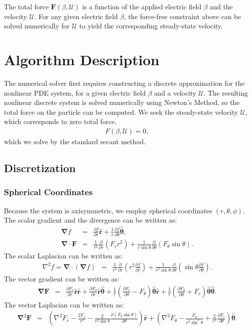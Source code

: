 \documentclass[10pt]{ijnam}
\newcommand{\deriv}[2]{\frac{\partial #1}{\partial #2}}
\newcommand{\pars}[1]{\left(#1\right)}
\newcommand\Laplacian{\nabla^2}
\newcommand\bnabla{\boldsymbol{\nabla}}
\newcommand\bLaplacian{\boldsymbol{\nabla}^2}
\newcommand\bF{\boldsymbol{F}}
\newcommand\br{\boldsymbol{r}}
\newcommand\brhat{\hat{\br}}
\newcommand\btheta{\boldsymbol{\theta}}
\newcommand\bthetahat{\hat{\btheta}}
\newcommand\cU{\mathscr{U}}
\begin{document}
The total force $\bF(\beta, \cU)$ is a function of the applied electric field $\beta$ and
the velocity $\cU$.
For any given electric field $\beta$, the force-free constraint above 
can be solved numerically for $\cU$ to yield the corresponding steady-state velocity.

\section{Algorithm Description} \label{sec:algorithm}
The numerical solver first requires constructing a discrete 
approximation for the nonlinear PDE system,
for a given electric field $\beta$ and a velocity $\cU$. 
The resulting nonlinear discrete system is
solved numerically using Newton's Method, so the total force on the
particle can be computed. 
We seek the steady-state velocity $\cU$, 
which corresponds to zero total force,
\begin{eqnarray*} 
F(\beta, \cU) = 0,
\end{eqnarray*}
which we solve by the standard secant method.

\subsection{Discretization}
\subsubsection{Spherical Coordinates}
Because the system is axisymmetric, we employ
spherical coordinates $(r,\theta,\phi)$.
The scalar gradient and the divergence can be written as:
\begin{eqnarray*}
\bnabla f &=& \deriv{f}{r}\brhat + \frac{1}{r}\deriv{f}{\theta}\bthetahat, \\
\bnabla \cdot \bF &=& \frac{1}{r^2}\deriv{}{r}\pars{F_r r^2 } + 
               \frac{1}{r \sin\theta}\deriv{}{\theta}\pars{F_\theta \sin\theta}.
\end{eqnarray*}
The scalar Laplacian can be written as:
\begin{eqnarray*}
\Laplacian f = \bnabla \cdot (\bnabla f)&=& 
 \frac{1}{r^2}\deriv{}{r}\pars{r^2 \deriv{f}{r}} + 
 \frac{1}{r^2 \sin\theta}\deriv{}{\theta}\pars{\sin\theta \deriv{f}{\theta}}.
\end{eqnarray*}
The vector gradient can be written as:
\begin{eqnarray*}
\bnabla \bF &=& \deriv{F_r}{r} \brhat \brhat + \deriv{F_\theta}{r} \brhat \bthetahat + 
\frac{1}{r}\pars{\deriv{F_r}{\theta} - F_\theta} \bthetahat \brhat + 
\frac{1}{r}\pars{\deriv{F_\theta}{\theta} + F_r} \bthetahat \bthetahat.
\end{eqnarray*}
The vector Laplacian can be written as:
\begin{eqnarray*}
\bLaplacian \bF &=& 
\left(\Laplacian F_r - \frac{2F_r}{r^2} - 
\frac{2}{r^2 \sin\theta} \deriv{\left(F_\theta \sin\theta \right)}{\theta}\right)\brhat
+ \left(\Laplacian F_\theta - \frac{F_\theta}{r^2 \sin^2\theta} + 
\frac{2}{r^2}\deriv{F_r}{\theta}\right) \bthetahat.
\end{eqnarray*}
\end{document}
